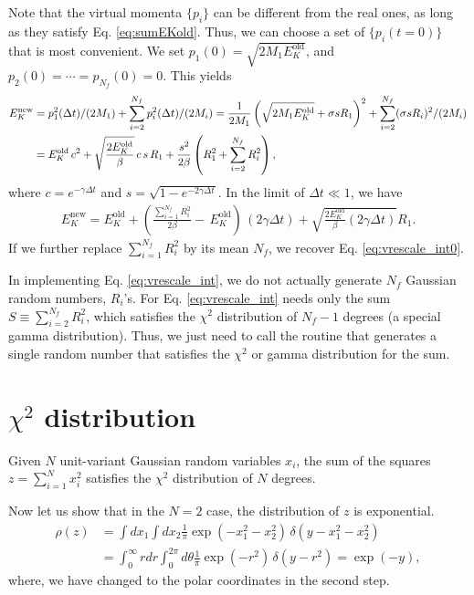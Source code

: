 \documentclass[11pt]{article}
\begin{document}
Note that the virtual momenta $\{p_i\}$
  can be different from the real ones,
  as long as they satisfy Eq. \eqref{eq:sumEKold}.
%
Thus, we can choose a set of $\{p_i(t = 0)\}$
  that is most convenient.
%
We set
$p_1(0) = \sqrt{2 M_1 E_K^\mathrm{old}}$,
and
$p_2(0) = \cdots = p_{N_f}(0) = 0$.
%
This yields\cite{bdp2007}
\begin{align}
  E_K^\mathrm{new}
&=
  p_1^2(\Delta t)/(2 M_1)
  + \sum_{i = 2}^{N_f} p_i^2(\Delta t) / (2 M_i)
= \frac{1}{2 M_1}
  \left(\sqrt{2 M_1 E_K^\mathrm{old}} + \sigma s R_1\right)^2
  + \sum_{i = 2}^{N_f} (\sigma s R_i)^2 / (2 M_i)
  \notag \\
&= E_K^\mathrm{old} \, c^2
  + \sqrt{ \frac {2 E_K^\mathrm{old}} {\beta} } \, c \, s \, R_1
  + \frac{ s^2 }{ 2 \beta }
  \left( R_1^2 + \sum_{i = 2}^{N_f} R_i^2 \right),
 \label{eq:vrescale_int}
\end{align}
%
where $c = e^{-\gamma \Delta t}$
and $s = \sqrt{1 - e^{-2\gamma \Delta t}}$.
%
In the limit of $\Delta t \ll 1$,
we have
\begin{align*}
  E_K^\mathrm{new}
= E_K^\mathrm{old}
+ \left(
    \frac { \sum_{i = 1}^{N_f} R_i^2 } { 2 \beta }
    - \, E_K^\mathrm{old}
  \right) \, (2 \gamma \Delta t)
  + \sqrt{ \frac {2 E_K^\mathrm{old} } {\beta} (2 \gamma \Delta t) }
    R_1.
\end{align*}
If we further replace $\sum_{i = 1}^{N_f} R_i^2$ by its mean $N_f$,
we recover Eq. \eqref{eq:vrescale_int0}.

In implementing Eq. \eqref{eq:vrescale_int},
we do not actually generate $N_f$ Gaussian random numbers, $R_i$'s.
%
For Eq. \eqref{eq:vrescale_int} needs only the sum $S \equiv \sum_{i = 2}^{N_f} R_i^2$,
which satisfies the $\chi^2$ distribution of $N_f - 1$ degrees
(a special gamma distribution).
%
Thus, we just need to call the routine that generates
a single random number that satisfies the $\chi^2$ or gamma distribution
for the sum.



\section{$\chi^2$ distribution}


Given $N$ unit-variant Gaussian random variables $x_i$,
the sum of the squares $z = \sum_{i = 1}^N x_i^2$
satisfies the $\chi^2$ distribution of $N$ degrees.

Now let us show that in the $N=2$ case,
the distribution of $z$ is exponential.
\begin{align*}
\rho(z)
&=
\int dx_1 \int dx_2
  \frac{1} {\pi}
  \exp(-x_1^2 - x_2^2)
  \,
  \delta(y - x_1^2 - x_2^2)
\\
&=
\int_0^\infty r dr \int_0^{2\pi} d\theta
  \frac{1} {\pi}
  \exp(-r^2)
  \,
  \delta(y - r^2)
= \exp(-y),
\end{align*}
where, we have changed to the polar coordinates
in the second step.
\end{document}
